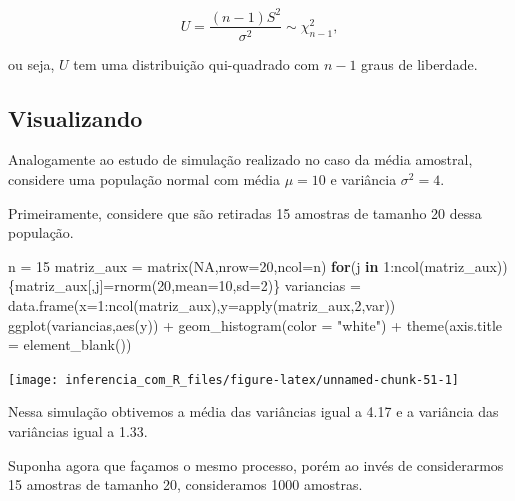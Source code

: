 \documentclass[
]{book}
\newenvironment{Shaded}{\begin{snugshade}}{\end{snugshade}}
\newcommand{\AttributeTok}[1]{\textcolor[rgb]{0.77,0.63,0.00}{#1}}
\newcommand{\ConstantTok}[1]{\textcolor[rgb]{0.00,0.00,0.00}{#1}}
\newcommand{\ControlFlowTok}[1]{\textcolor[rgb]{0.13,0.29,0.53}{\textbf{#1}}}
\newcommand{\DecValTok}[1]{\textcolor[rgb]{0.00,0.00,0.81}{#1}}
\newcommand{\FunctionTok}[1]{\textcolor[rgb]{0.00,0.00,0.00}{#1}}
\newcommand{\NormalTok}[1]{#1}
\newcommand{\OtherTok}[1]{\textcolor[rgb]{0.56,0.35,0.01}{#1}}
\newcommand{\SpecialCharTok}[1]{\textcolor[rgb]{0.00,0.00,0.00}{#1}}
\newcommand{\StringTok}[1]{\textcolor[rgb]{0.31,0.60,0.02}{#1}}
\begin{document}
\[U=\frac{(n-1)S^2}{\sigma^2}\sim \chi^2_{n-1},\]

ou seja, \(U\) tem uma distribuição qui-quadrado com \(n-1\) graus de liberdade.

\hypertarget{visualizando-2}{%
\subsection{Visualizando}\label{visualizando-2}}

Analogamente ao estudo de simulação realizado no caso da média amostral, considere uma população normal com média \(\mu=10\) e variância \(\sigma^2=4\).

Primeiramente, considere que são retiradas 15 amostras de tamanho 20 dessa população.

\begin{Shaded}
\begin{Highlighting}[]
\NormalTok{n }\OtherTok{=} \DecValTok{15}
\NormalTok{matriz\_aux }\OtherTok{=} \FunctionTok{matrix}\NormalTok{(}\ConstantTok{NA}\NormalTok{,}\AttributeTok{nrow=}\DecValTok{20}\NormalTok{,}\AttributeTok{ncol=}\NormalTok{n)}
\ControlFlowTok{for}\NormalTok{(j }\ControlFlowTok{in} \DecValTok{1}\SpecialCharTok{:}\FunctionTok{ncol}\NormalTok{(matriz\_aux))\{matriz\_aux[,j]}\OtherTok{=}\FunctionTok{rnorm}\NormalTok{(}\DecValTok{20}\NormalTok{,}\AttributeTok{mean=}\DecValTok{10}\NormalTok{,}\AttributeTok{sd=}\DecValTok{2}\NormalTok{)\}}
\NormalTok{variancias }\OtherTok{=} \FunctionTok{data.frame}\NormalTok{(}\AttributeTok{x=}\DecValTok{1}\SpecialCharTok{:}\FunctionTok{ncol}\NormalTok{(matriz\_aux),}\AttributeTok{y=}\FunctionTok{apply}\NormalTok{(matriz\_aux,}\DecValTok{2}\NormalTok{,var))}
\FunctionTok{ggplot}\NormalTok{(variancias,}\FunctionTok{aes}\NormalTok{(y)) }\SpecialCharTok{+}
  \FunctionTok{geom\_histogram}\NormalTok{(}\AttributeTok{color =} \StringTok{"white"}\NormalTok{) }\SpecialCharTok{+}
  \FunctionTok{theme}\NormalTok{(}\AttributeTok{axis.title =} \FunctionTok{element\_blank}\NormalTok{())}
\end{Highlighting}
\end{Shaded}

\begin{center}\texttt{[image: inferencia\_com\_R\_files/figure-latex/unnamed-chunk-51-1]} \end{center}

Nessa simulação obtivemos a média das variâncias igual a 4.17 e a variância das variâncias igual a 1.33.

Suponha agora que façamos o mesmo processo, porém ao invés de considerarmos 15 amostras de tamanho 20, consideramos 1000 amostras.
\end{document}
